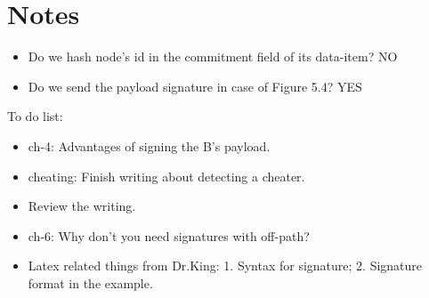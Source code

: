 \chapter{Notes}

\begin{itemize}
	\item Do we hash node's id in the commitment field of its data-item? NO
	\item Do we send the payload signature in case of Figure 5.4? YES
\end{itemize}

To do list:
\begin{itemize}
	\item ch-4: Advantages of signing the B's payload.
	\item cheating: Finish writing about detecting a cheater.
	\item Review the writing.

	\item ch-6: Why don't you need signatures with off-path?

	\item Latex related things from Dr.King: 1. Syntax for signature; 2. Signature format in the example.  	
\end{itemize}